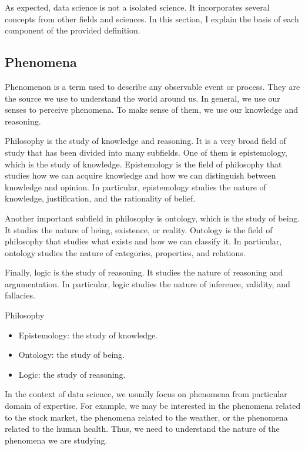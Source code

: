 As expected, data science is not a isolated science.  It incorporates several concepts
from other fields and sciences.  In this section, I explain the basis of each component of
the provided definition.

\subsection{Phenomena}

Phenomenon is a term used to describe any observable event or process.  They are the
source we use to understand the world around us.  In general, we use our senses to
perceive phenomena.  To make sense of them, we use our knowledge and reasoning.

Philosophy is the study of knowledge and reasoning.  It is a very broad field of study
that has been divided into many subfields.  One of them is epistemology, which is the
study of knowledge.  Epistemology is the field of philosophy that studies how we can
acquire knowledge and how we can distinguish between knowledge and opinion.  In
particular, epistemology studies the nature of knowledge, justification, and the
rationality of belief.

Another important subfield in philosophy is ontology, which is the study of being.  It
studies the nature of being, existence, or reality.  Ontology is the field of philosophy
that studies what exists and how we can classify it.  In particular, ontology studies the
nature of categories, properties, and relations.

Finally, logic is the study of reasoning.  It studies the nature of reasoning and
argumentation.  In particular, logic studies the nature of inference, validity, and
fallacies.

\begin{slidebox}{Philosophy}{}
  \begin{itemize}
    \item Epistemology: the study of knowledge.
    \item Ontology: the study of being.
    \item Logic: the study of reasoning.
  \end{itemize}
\end{slidebox}

In the context of data science, we usually focus on phenomena from particular domain of
expertise.  For example, we may be interested in the phenomena related to the stock
market, the phenomena related to the weather, or the phenomena related to the human
health.  Thus, we need to understand the nature of the phenomena we are studying.

